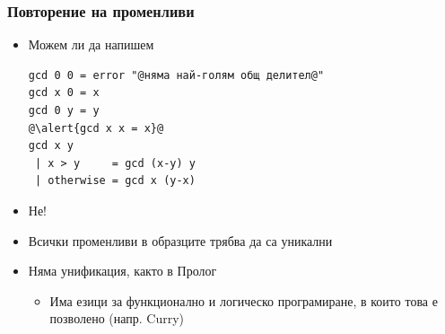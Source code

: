 \documentclass[alsotrans,beameroptions={aspectratio=169}]{beamerswitch}
\begin{document}
\begin{frame}[fragile]
  \frametitle{Повторение на променливи}
  \begin{itemize}[<+->]
  \item Можем ли да напишем
\begin{lstlisting}
gcd 0 0 = error "@няма най-голям общ делител@"
gcd x 0 = x
gcd 0 y = y
@\alert{gcd x x = x}@
gcd x y
 | x > y     = gcd (x-y) y
 | otherwise = gcd x (y-x)
\end{lstlisting}
  \item \alert{Не!}
  \item Всички променливи в образците трябва да са уникални
  \item Няма унификация, както в Пролог
    \begin{itemize}
    \item Има езици за функционално и логическо програмиране, в които това е позволено (напр. Curry)
    \end{itemize}
\end{itemize}
\end{frame}
\end{document}
